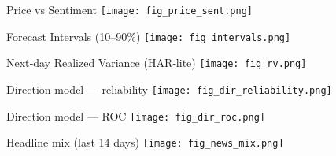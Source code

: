 \documentclass[11pt]{beamer}
\begin{document}
\begin{frame}{Price vs Sentiment}
  \centering
  \texttt{[image: fig\_price\_sent.png]}
\end{frame}

\begin{frame}{Forecast Intervals (10--90\%)}
  \centering
  \texttt{[image: fig\_intervals.png]}
\end{frame}

\begin{frame}{Next‑day Realized Variance (HAR‑lite)}
  \centering
  \texttt{[image: fig\_rv.png]}
\end{frame}

\begin{frame}{Direction model — reliability}
  \centering
  \texttt{[image: fig\_dir\_reliability.png]}
\end{frame}

\begin{frame}{Direction model — ROC}
  \centering
  \texttt{[image: fig\_dir\_roc.png]}
\end{frame}

\begin{frame}{Headline mix (last 14 days)}
  \centering
  \texttt{[image: fig\_news\_mix.png]}
\end{frame}
\end{document}
